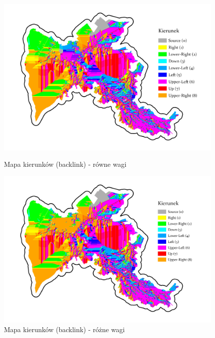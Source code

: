 \documentclass{article}
\begin{document}
\begin{figure}[H]
    \begin{minipage}[t]{0.48\textwidth}
        \centering
        \includegraphics[width=\linewidth]{img/cost-backlink.jpg}
        \caption{Mapa kierunków (backlink) - równe wagi}
        \label{fig:backlink-rowne}
    \end{minipage}
    \hfill
    \begin{minipage}[t]{0.48\textwidth}
        \centering
        \includegraphics[width=\linewidth]{img/roznewagi-cost-backlink.jpg}
        \caption{Mapa kierunków (backlink) - różne wagi}
        \label{fig:backlink-rozne}
    \end{minipage}
\end{figure}
\vspace{10pt}
\end{document}
